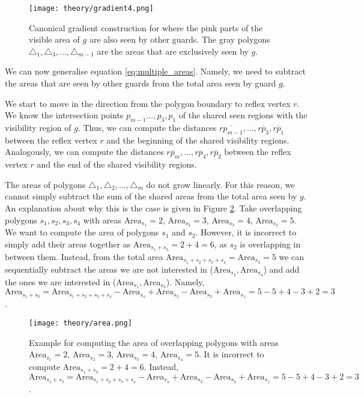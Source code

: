 \begin{figure}[h!]
    \centering
    \texttt{[image: theory/gradient4.png]}
    \caption{Canonical gradient construction for where the pink parts of the visible area of $g$ are also seen by other guards. The gray polygons $\triangle_1, \triangle_3, ..., \triangle_{m - 1}$ are the areas that are exclusively seen by $g$.}
    \label{fig:general_gradient} 
\end{figure}

We can now generalise equation \ref{eq:multiple_areas}. Namely, we need to subtract the areas that are seen by other guards from the total area seen by guard $g$. 

We start to move in the direction from the polygon boundary to reflex vertex $r$. We know the intersection points $p_{m - 1} ..., p_3, p_1$ of the shared seen regions with the visibility region of $g$. Thus, we can compute the distances $\overline{rp_{m - 1}}, ..., \overline{rp_3}, \overline{rp_1}$ between the reflex vertex $r$ and the beginning of the shared visibility regions. Analogously, we can compute the distances $\overline{rp_m}, ...,  \overline{rp_4}, \overline{rp_2}$ between the reflex vertex $r$ and the end of the shared visibility regions.

The areas of polygons $\triangle_1, \triangle_2, ..., \triangle_m$ do not grow linearly. For this reason, we cannot simply subtract the sum of the shared areas from the total area seen by $g$. An explanation about why this is the case is given in Figure \ref{fig:areas}. Take overlapping polygons $s_1, s_2, s_3, s_4$ with areas $\text{Area}_{s_1} = 2$, $\text{Area}_{s_2} = 3$, $\text{Area}_{s_3} = 4$, $\text{Area}_{s_4} = 5$. We want to compute the area of polygons $s_1$ and $s_2$. However, it is incorrect to simply add their areas together as $\text{Area}_{s_1 + s_3} = 2 + 4 = 6$, as $s_2$ is overlapping in between them. Instead, from the total area $\text{Area}_{s_1 + s_2 + s_3 + s_4} = \text{Area}_{s_4} = 5$ we can sequentially subtract the areas we are not interested in ($\text{Area}_{s_2}, \text{Area}_{s_4}$) and add the ones we are interested in ($\text{Area}_{s_1}, \text{Area}_{s_3}$). Namely, $\text{Area}_{s_1 + s_3} = \text{Area}_{s_1 + s_2 + s_3 + s_4} - \text{Area}_{s_4} + \text{Area}_{s_3} - \text{Area}_{s_2} + \text{Area}_{s_1} = 5 - 5 + 4 - 3 + 2 = 3$.

\begin{figure}[h!]
    \centering
    \texttt{[image: theory/area.png]}
    \caption{Example for computing the area of overlapping polygons with areas $\text{Area}_{s_1} = 2$, $\text{Area}_{s_2} = 3$, $\text{Area}_{s_3} = 4$, $\text{Area}_{s_4} = 5$. It is incorrect to compute $\text{Area}_{s_1 + s_3} = 2 + 4 = 6$. Instead, $\text{Area}_{s_1 + s_3} = \text{Area}_{s_1 + s_2 + s_3 + s_4} - \text{Area}_{s_4} + \text{Area}_{s_3} - \text{Area}_{s_2} + \text{Area}_{s_1} = 5 - 5 + 4 - 3 + 2 = 3$.}
    \label{fig:areas}
\end{figure}

